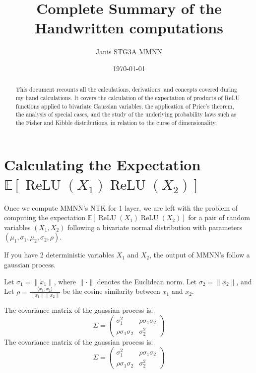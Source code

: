 \documentclass[11pt, a4paper]{article}
\title{Complete Summary of the Handwritten computations}
\author{Janis STG3A MMNN}
\date{\today}
\newcommand{\E}{\mathbb{E}}
\DeclareMathOperator{\ReLU}{ReLU}
\begin{document}
\maketitle

\begin{abstract}
This document recounts all the calculations, derivations, and concepts covered during my hand calculations. It covers the calculation of the expectation of products of ReLU functions applied to bivariate Gaussian variables, the application of Price's theorem, the analysis of special cases, and the study of the underlying probability laws such as the Fisher and Kibble distributions, in relation to the curse of dimensionality.
\end{abstract}
\tableofcontents
\newpage


\section{Calculating the Expectation $\E[\ReLU(X_1)\ReLU(X_2)]$}
Once we compute MMNN's NTK for 1 layer, we are left with the problem of computing the expectation $\E[\ReLU(X_1)\ReLU(X_2)]$ for a pair of random variables $(X_1, X_2)$ following a bivariate normal distribution with parameters $(\mu_1, \sigma_1, \mu_2, \sigma_2, \rho)$.

If you have 2 deterministic variables $X_1$ and $X_2$, the output of MMNN's follow a gaussian process.

Let $\sigma_1 = \|x_1\|$, where $\|\cdot\|$ denotes the Euclidean norm.
Let $\sigma_2 = \|x_2\|$, and
Let $\rho = \frac{\langle x_1, x_2 \rangle}{\|x_1\| \|x_2\|}$ be the cosine similarity between $x_1$ and $x_2$.

The covariance matrix of the gaussian process is:
\[
\Sigma = \begin{pmatrix}
\sigma_1^2 & \rho\sigma_1\sigma_2 \\
\rho\sigma_1\sigma_2 & \sigma_2^2
\end{pmatrix}
\]
The covariance matrix of the gaussian process is:
\[
\Sigma = \begin{pmatrix}
\sigma_1^2 & \rho\sigma_1\sigma_2 \\
\rho\sigma_1\sigma_2 & \sigma_2^2
\end{pmatrix}
\]
\end{document}
